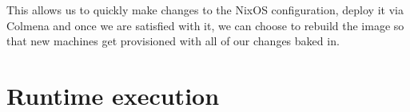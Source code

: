 \begin{Shaded}
\begin{Highlighting}[]
\OperatorTok{\{}
   \OperatorTok{=} \OperatorTok{\{}
     \OperatorTok{=} \OperatorTok{;}
  \OperatorTok{\};}

   \OperatorTok{=}\OperatorTok{\{} \OperatorTok{,} \OperatorTok{,}  \OperatorTok{\}}\NormalTok{:}
       \OperatorTok{=} \OperatorTok{(}  \OperatorTok{\{} \OperatorTok{;}  \OperatorTok{=} \OperatorTok{;} \OperatorTok{\});}

       \OperatorTok{=} \OperatorTok{\{}
         \OperatorTok{=} \OperatorTok{;}
      \OperatorTok{\};}

       \OperatorTok{=}   \OperatorTok{\{}
        \OperatorTok{;}
         \OperatorTok{=} \OperatorTok{[}\OperatorTok{];}
      \OperatorTok{\};}
    \OperatorTok{\{}
       \OperatorTok{=} \OperatorTok{\{}
         \OperatorTok{=} \OperatorTok{\{}
           \OperatorTok{=}\OperatorTok{;}
        \OperatorTok{\};}
         \OperatorTok{=}\OperatorTok{;}
      \OperatorTok{\}} \OperatorTok{//} \OperatorTok{(}\OperatorTok{);}
    \OperatorTok{\};}
\OperatorTok{\}}
\end{Highlighting}
\end{Shaded}

This allows us to quickly make changes to the NixOS configuration,
deploy it via Colmena and once we are satisfied with it, we can choose
to rebuild the image so that new machines get provisioned with all of
our changes baked in.

\hypertarget{runtime-execution}{%
\section{Runtime execution}\label{runtime-execution}}

